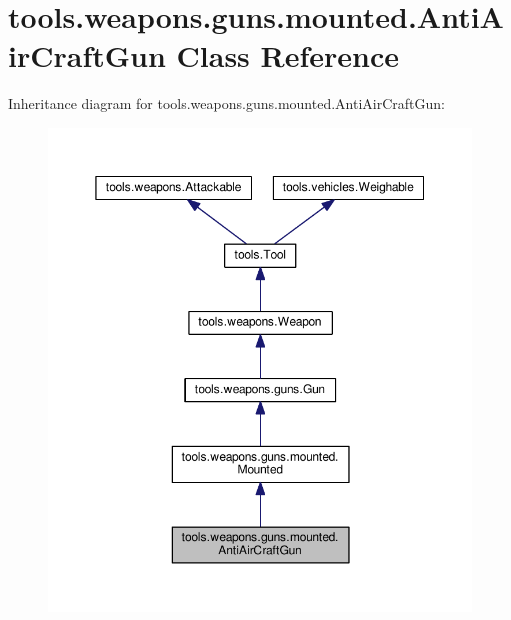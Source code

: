 \hypertarget{classtools_1_1weapons_1_1guns_1_1mounted_1_1_anti_air_craft_gun}{}\section{tools.\+weapons.\+guns.\+mounted.\+Anti\+Air\+Craft\+Gun Class Reference}
\label{classtools_1_1weapons_1_1guns_1_1mounted_1_1_anti_air_craft_gun}


Inheritance diagram for tools.\+weapons.\+guns.\+mounted.\+Anti\+Air\+Craft\+Gun\+:
\nopagebreak
\begin{figure}[H]
\begin{center}
\leavevmode
\includegraphics[width=350pt]{classtools_1_1weapons_1_1guns_1_1mounted_1_1_anti_air_craft_gun__inherit__graph}
\end{center}
\end{figure}


